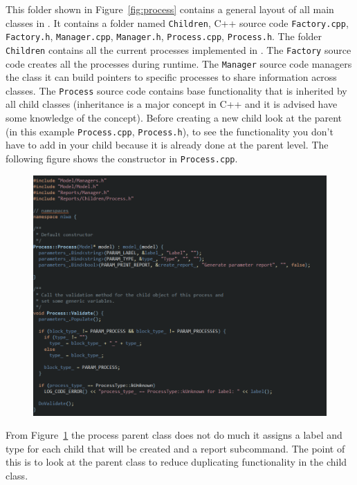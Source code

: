 This folder shown in Figure~\ref{fig:process} contains a general layout of all main classes in \CNAME. It contains a folder named \texttt{Children}, C++ source code \texttt{Factory.cpp}, \texttt{Factory.h}, \texttt{Manager.cpp}, \texttt{Manager.h}, \texttt{Process.cpp}, \texttt{Process.h}. The folder \texttt{Children} contains all the current processes implemented in \CNAME. The \texttt{Factory} source code creates all the processes during runtime. The \texttt{Manager} source code managers the class it can build pointers to specific processes to share information across classes. The \texttt{Process} source code contains base functionality that is inherited by all child classes (inheritance is a major concept in C++ and it is  advised have some knowledge of the concept). Before creating a new child look at the parent (in this example \texttt{Process.cpp}, \texttt{Process.h}), to see the functionality you don't have to add in your child because it is already done at the parent level. The following figure shows the constructor in \texttt{Process.cpp}.
\clearpage
\begin{figure}[!ht]
	\centering
	\includegraphics[scale=0.6]{Figures/add_survival1.png}
	\caption{}\label{fig:process1}
\end{figure}

From Figure~\ref{fig:process1} the process parent class does not do much it assigns a label and type for each child that will be created and a report subcommand. The point of this is to look at the parent class to reduce duplicating functionality in the child class.


